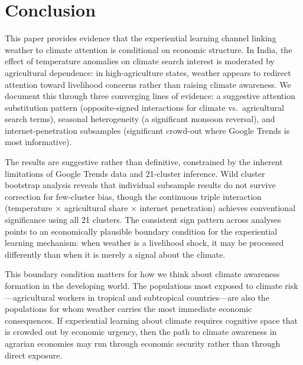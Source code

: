 \documentclass[12pt]{article}
\begin{document}
\section{Conclusion}
\label{sec:conclusion}

This paper provides evidence that the experiential learning channel linking weather to climate attention is conditional on economic structure. In India, the effect of temperature anomalies on climate search interest is moderated by agricultural dependence: in high-agriculture states, weather appears to redirect attention toward livelihood concerns rather than raising climate awareness. We document this through three converging lines of evidence: a suggestive attention substitution pattern (opposite-signed interactions for climate vs.\ agricultural search terms), seasonal heterogeneity (a significant monsoon reversal), and internet-penetration subsamples (significant crowd-out where Google Trends is most informative).

The results are suggestive rather than definitive, constrained by the inherent limitations of Google Trends data and 21-cluster inference. Wild cluster bootstrap analysis reveals that individual subsample results do not survive correction for few-cluster bias, though the continuous triple interaction (temperature $\times$ agricultural share $\times$ internet penetration) achieves conventional significance using all 21 clusters. The consistent sign pattern across analyses points to an economically plausible boundary condition for the experiential learning mechanism: when weather is a livelihood shock, it may be processed differently than when it is merely a signal about the climate.

This boundary condition matters for how we think about climate awareness formation in the developing world. The populations most exposed to climate risk---agricultural workers in tropical and subtropical countries---are also the populations for whom weather carries the most immediate economic consequences. If experiential learning about climate requires cognitive space that is crowded out by economic urgency, then the path to climate awareness in agrarian economies may run through economic security rather than through direct exposure.
\end{document}
